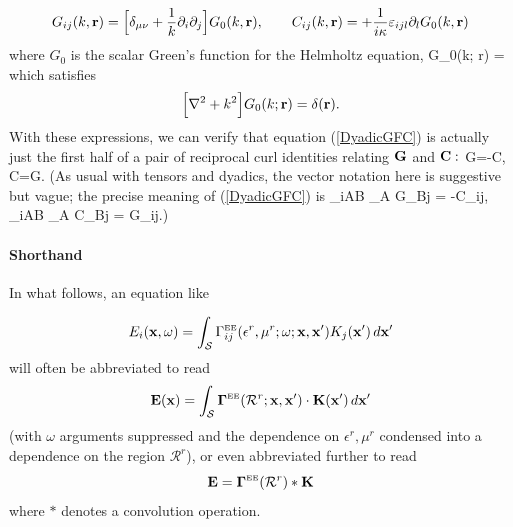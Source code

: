 \documentclass[letterpaper]{article}
\begin{document}
\begin{equation}
G_{ij}(k,\mathbf{r}) =
  \Big[\delta_{\mu\nu} +\frac{1}{k} \partial_i \partial_j \Big]
  G_0(k, \mathbf{r}), \qquad
  C_{ij}(k, \mathbf{r}) = +\frac{1}{i\kappa} \varepsilon_{ijl} 
                          \partial_l G_0(k, \mathbf{r})
\label{GCfromG0}
\end{equation}
where $G_0$ is the scalar Green's function for the Helmholtz equation,
{G_0(k; \vb r)
   =
}
which satisfies
$$ \Big[ \nabla^2 + k^2 \Big] G_0(k; \mathbf{r})
   =\delta(\mathbf{r}).
$$
With these expressions, we can verify that equation (\ref{DyadicGFC}) 
is actually just the first half of a pair of reciprocal curl identities 
relating $\mathbf{G}$ and $\mathbf{C}:$
{
   \nabla \times \vb G=-\vb C, 
\qquad
   \nabla \times \vb C=\vb G.
}
(As usual with tensors and dyadics, the vector notation here
is suggestive but vague; the precise meaning of (\ref{DyadicGFC}) is 
{
    \varepsilon_{iAB} \partial_A G_{Bj} = -C_{ij},
   \qquad
    \varepsilon_{iAB} \partial_A C_{Bj} = G_{ij}.)
}



\paragraph{Shorthand} In what follows, an equation like 

$$ E_i(\mathbf{x}, \omega) = 
   \int_{\mathcal S} 
     \Gamma^{\hbox{\tiny{EE}}}_{ij}(\epsilon^r, \mu^r; \omega; 
                          \mathbf{x}, \mathbf{x}^\prime) 
     K_j(\mathbf{x}^\prime)
    \, d\mathbf{x}^\prime
$$
will often be abbreviated to read 
$$ \mathbf{E}(\mathbf{x}) = 
    \int_{\mathcal S} 
      \boldsymbol{\Gamma}^{\hbox{\tiny{EE}}}(\mathcal{R}^r; \mathbf{x}, \mathbf{x}^\prime) 
         \cdot \mathbf{K}(\mathbf{x}^\prime) 
    \, d\mathbf{x}^\prime
$$
(with $\omega$ arguments suppressed and the dependence 
on $\epsilon^r, \mu^r$ condensed into a dependence
on the region $\mathcal{R}^r$), or even abbreviated further
to read
$$ \mathbf{E} = \boldsymbol{\Gamma}^{\hbox{\tiny{EE}}}(\mathcal{R}^r) * \mathbf{K} $$
where $*$ denotes a convolution operation.

\newpage
\end{document}
